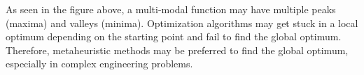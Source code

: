 As seen in the figure above, a multi-modal function may have multiple peaks (maxima) and valleys (minima). Optimization algorithms may get stuck in a local optimum depending on the starting point and fail to find the global optimum. Therefore, metaheuristic methods may be preferred to find the global optimum, especially in complex engineering problems. 